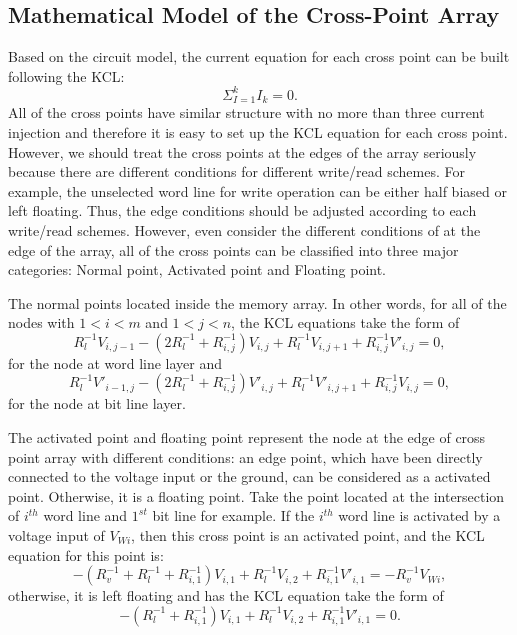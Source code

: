 \subsection{Mathematical Model of the Cross-Point Array}
Based on the circuit model, the current equation for each cross point can be built following the KCL:
\begin{equation}
  {\Sigma}_{I=1}^kI_k=0.
\end{equation}
All of the cross points have similar structure with no more than three current injection and therefore it is easy to set up the KCL equation for each cross point. However, we should treat the cross points at the edges of the array seriously because there are different conditions for different write/read schemes. For example, the unselected word line for write operation can be either half biased or left floating. Thus, the edge conditions should be adjusted according to each write/read schemes. However, even consider the different conditions of at the edge of the array, all of the cross points can be classified into three major categories: Normal point, Activated point and Floating point.

The normal points located inside the memory array. In other words, for all of the nodes with $1<i<m$ and $1<j<n$, the KCL equations take the form of
\begin{equation}\label{equ:KCL1}
R_l^{-1}V_{i,j-1} -(2R_l^{-1}+R_{i,j}^{-1})V_{i,j}+ R_l^{-1}V_{i,j+1}+R_{i,j}^{-1}V'_{i,j}=0,
\end{equation}
for the node at word line layer and
\begin{equation}\label{equ:KCL2}
R_l^{-1}V'_{i-1,j} -(2R_l^{-1}+R_{i,j}^{-1})V'_{i,j}+ R_l^{-1}V'_{i,j+1}+R_{i,j}^{-1}V_{i,j}=0,
\end{equation}
for the node at bit line layer.

The activated point and floating point represent the node at the edge of cross point array with different conditions: an edge point, which have been directly connected to the voltage input or the ground, can be considered as a activated point. Otherwise, it is a floating point. Take the point located at the intersection of $i^{th}$ word line and $1^{st}$ bit line for example. If the $i^{th}$ word line is activated by a voltage input of $V_{Wi}$, then this cross point is an activated point, and the KCL equation for this point is:
\begin{equation}\label{equ:KCL3}
-(R_v^{-1}+R_l^{-1}+R_{i,1}^{-1})V_{i,1}+ R_l^{-1}V_{i,2}+R_{i,1}^{-1}V'_{i,1}=-R_v^{-1}V_{Wi},
\end{equation}
otherwise, it is left floating and has the KCL equation take the form of
\begin{equation}\label{equ:KCL4}
-(R_l^{-1}+R_{i,1}^{-1})V_{i,1}+ R_l^{-1}V_{i,2}+R_{i,1}^{-1}V'_{i,1}=0.
\end{equation}

